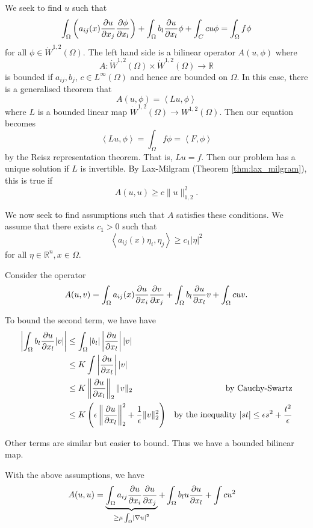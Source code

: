 \documentclass[10pt, oneside, reqno]{amsart}
\theoremstyle{plain}%
\numberwithin{equation}{section}
\theoremstyle{definition}
\theoremstyle{remark}
\newcommand{\R}{\mathbb{R}}
\newcommand{\iprod}[1]{\left\langle #1 \right\rangle}
\begin{document}
We seek to find $u$ such that \[
	\int_\Omega \left( a_{ij}(x) \frac{\partial u}{\partial x_j} \frac{\partial \phi}{\partial x_l}\right) + \int_\Omega b_l \frac{\partial u}{\partial x_l} \phi + \int_C c u \phi = \int_\Omega f \phi 
 \] for all $\phi \in \dot W^{1, 2}(\Omega)$.  The left hand side is a bilinear operator $A(u, \phi)$ where
 \[
 	A: \dot W^{1, 2}(\Omega) \times \dot W^{1, 2}(\Omega) \rightarrow \R
 \] is bounded if $a_{ij}, b_j$, $c \in L^\infty(\Omega)$ and hence are bounded on $\Omega$.  In this case, there is a generalised theorem that \[
 	A(u, \phi) = \iprod{Lu, \phi} 
 \] where $L$ is a bounded linear map $\dot W^{1, 2}(\Omega) \rightarrow W^{1, 2}(\Omega)$.  Then our equation becomes \[
 	\iprod{Lu, \phi} = \int_\Omega f \phi = \iprod{F, \phi}
 \] by the Reisz representation theorem.  That is, $Lu = f$.  Then our problem has a unique solution if $L$ is invertible.  By Lax-Milgram (Theorem \ref{thm:lax_milgram}), this is true if \[
 	A(u, u) \geq c \| u \|^2_{1, 2}.
\]

We now seek to find assumptions such that $A$ satisfies these conditions.  We assume that there exists $c_1 > 0$ such that \[
	\iprod{a_{ij}(x)\eta_i, \eta_j} \geq c_1 |\eta|^2 \tag{$\dagger \dagger$}
\] for all $\eta \in \R^n, x \in \Omega$. 

Consider the operator \[
	A(u, v) = \int_\Omega a_{ij}(x) \frac{\partial u}{\partial x_i} \frac{\partial v}{\partial x_j} + \int_\Omega b_l \frac{\partial u}{\partial x_l} v + \int_\Omega cuv.
 \]


To bound the second term, we have have \begin{align*}
	\left| \int_\Omega b_l \frac{\partial u}{\partial x_l} |v| \right| &\leq \int_\Omega |b_l| \left| \frac{\partial u}{\partial x_l} \right| |v| \\
	&\leq K \int \left| \frac{\partial u}{\partial x_l} \right| |v| \\
	&\leq K \left\| \frac{\partial u}{\partial x_l} \right\|_2 \| v \|_2  &\text{by Cauchy-Swartz} \\
	&\leq K \left( \epsilon \left\| \frac{\partial u}{\partial x_l} \right \|_2^2 +  \frac{1}{\epsilon} \|v\|_2^2 \right) &\text{by the inequality $|st| \leq \epsilon s^2 + \frac{t^2}{\epsilon}$}
\end{align*}

Other terms are similar but easier to bound.  Thus we have a bounded bilinear map.

With the above assumptions, we have \begin{align*}
	A(u, u) &= \underbrace{\int_\Omega a_{ij}\frac{\partial u}{\partial x_i}\frac{\partial u}{\partial x_j}}_{\geq \mu \int_\Omega \left| \nabla u \right|^2} + \int_\Omega b_l u \frac{\partial u}{\partial x_l} + \int c u^2			
\end{align*}
\end{document}
